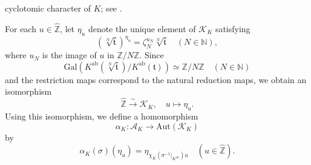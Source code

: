 \documentclass[reqno,11pt]{article}
\theoremstyle{plain} %
\theoremstyle{definition} %
\begin{document}
cyclotomic character of $K$; see \cite[$\S$V.5]{Milne}.
\par
For each $u\in\widehat{\mathbb{Z}}$, let $\eta_u$ denote the unique
 element of $\mathcal{K}_K$ satisfying
\begin{equation*}
\left(\sqrt[N]{\mathfrak{t}}\right)^{\eta_u}
=\zeta_N^{u_N}\sqrt[N]{\mathfrak{t}}
\quad(N\in\mathbb{N}),
\end{equation*}
where $u_N$ is the image of $u$ in $\mathbb{Z}/N\mathbb{Z}$. Since
\begin{equation*}
\mathrm{Gal}\left(
K^\mathrm{ab}(\sqrt[N]{\mathfrak{t}})/K^\mathrm{ab}(\mathfrak{t})
\right)\simeq\mathbb{Z}/N\mathbb{Z}
\quad(N\in\mathbb{N})
\end{equation*}
and the restriction maps correspond to the natural reduction maps, we
obtain an isomorphism 
\begin{equation}\label{ZKue}
\widehat{\mathbb{Z}}\stackrel{\sim}{\rightarrow}\mathcal{K}_K,
\quad u\mapsto\eta_u.
\end{equation}
Using this isomorphism, we define a homomorphism
\begin{equation*}
\alpha_K:\mathcal{A}_K\rightarrow\mathrm{Aut}(\mathcal{K}_K)
\end{equation*}
by
\begin{equation*}
\alpha_K(\sigma)(\eta_u)=
\eta_{\chi_K(\sigma^{-1}|_{K^\mathrm{ab}})u}
\quad(u\in\widehat{\mathbb{Z}}).
\end{equation*}
\end{document}
